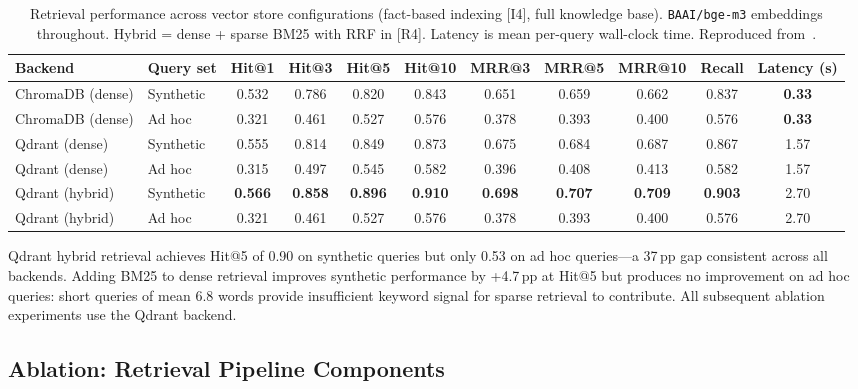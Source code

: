 \documentclass[sigconf,natbib=true]{acmart}
\begin{document}
\begin{table}[t]
\centering
\caption{Retrieval performance across vector store configurations (fact-based indexing [I4], full knowledge base). \texttt{BAAI/bge-m3} embeddings throughout. Hybrid = dense + sparse BM25 with RRF in [R4]. Latency is mean per-query wall-clock time. Reproduced from~\cite{[COMPANION_PAPER]}.}
\label{tab:retrieval_baseline}
\setlength{\tabcolsep}{4pt}
\small
\begin{tabular}{llccccccccc}
\toprule
\textbf{Backend} & \textbf{Query set}
  & \textbf{Hit@1} & \textbf{Hit@3} & \textbf{Hit@5} & \textbf{Hit@10}
  & \textbf{MRR@3} & \textbf{MRR@5} & \textbf{MRR@10}
  & \textbf{Recall}
  & \textbf{Latency (s)} \\
\midrule
ChromaDB (dense) & Synthetic & 0.532 & 0.786 & 0.820 & 0.843 & 0.651 & 0.659 & 0.662 & 0.837 & \textbf{0.33} \\
ChromaDB (dense) & Ad hoc    & 0.321 & 0.461 & 0.527 & 0.576 & 0.378 & 0.393 & 0.400 & 0.576 & \textbf{0.33} \\
\midrule
Qdrant (dense)   & Synthetic & 0.555 & 0.814 & 0.849 & 0.873 & 0.675 & 0.684 & 0.687 & 0.867 & 1.57 \\
Qdrant (dense)   & Ad hoc    & 0.315 & 0.497 & 0.545 & 0.582 & 0.396 & 0.408 & 0.413 & 0.582 & 1.57 \\
\midrule
Qdrant (hybrid)  & Synthetic & \textbf{0.566} & \textbf{0.858} & \textbf{0.896} & \textbf{0.910} & \textbf{0.698} & \textbf{0.707} & \textbf{0.709} & \textbf{0.903} & 2.70 \\
Qdrant (hybrid)  & Ad hoc    & 0.321 & 0.461 & 0.527 & 0.576 & 0.378 & 0.393 & 0.400 & 0.576 & 2.70 \\
\bottomrule
\end{tabular}
\end{table}

Qdrant hybrid retrieval achieves Hit@5 of 0.90 on synthetic queries but only 0.53 on ad hoc queries---a 37\,pp gap consistent across all backends.
Adding BM25 to dense retrieval improves synthetic performance by +4.7\,pp at Hit@5 but produces no improvement on ad hoc queries: short queries of mean 6.8 words provide insufficient keyword signal for sparse retrieval to contribute.
All subsequent ablation experiments use the Qdrant backend.

\subsection{Ablation: Retrieval Pipeline Components}
\label{sec:ablation}
\end{document}
